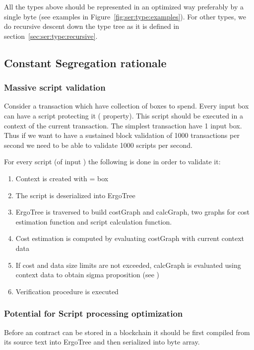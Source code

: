All the types above should be represented in an optimized way preferably by a single
byte (see examples in Figure~\ref{fig:ser:type:examples}). For other types, we do
recursive descent down the type tree as it is defined in
section~\ref{sec:ser:type:recursive}.

\subsection{Constant Segregation rationale}

\subsubsection{Massive script validation}

Consider a transaction  which have  collection of boxes to
spend. Every input box can have a script protecting it (
property). This script should be executed in a context of the current
transaction. The simplest transaction have 1 input box. Thus if we want to
have a sustained block validation of 1000 transactions per second we need to
be able to validate 1000 scripts per second.

For every script (of input ) the following is done in order to
validate it:
\begin{enumerate}
    \item Context is created with  = box
    \item The script is deserialized into ErgoTree 
    \item ErgoTree is traversed to build costGraph and calcGraph, two graphs for
    cost estimation function and script calculation function.
    \item Cost estimation is computed by evaluating costGraph with current context data
    \item If cost and data size limits are not exceeded, calcGraph is
    evaluated using context data to obtain sigma proposition (see
    \hyperref[sec:type:SigmaProp]{})
    \item Verification procedure is executed
\end{enumerate}

\subsubsection{Potential for Script processing optimization}

Before an \langname contract can be stored in a blockchain it should be first
compiled from its source text into ErgoTree and then serialized into byte
array.

